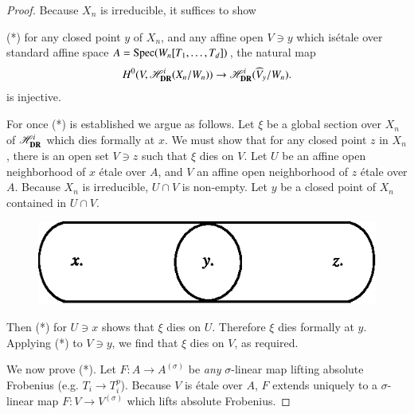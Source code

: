 \begin{proof}
Because $X_{n}$ is irreducible, it suffices to show

\smallskip
\noindent
(*) for any closed point $y$ of $X_{n}$, and any affine open $V\ni y$ which is\break \'etale over standard affine space $A=\operatorname{Spec}(W_{n}[T_{1},\ldots,T_{d}])$, the natural map
$$
H^{0}(V,\mathscr{H}^{i}_{\mathbf{DR}}(X_{n}/W_{n}))\to \mathscr{H}^{i}_{\mathbf{DR}}(\widehat{V}_{y}/W_{n}).
$$
is injective.

For once (*) is established we argue as follows. Let $\xi$ be a global section over $X_{n}$ of $\mathscr{H}^{i}_{\mathbf{DR}}$ which dies formally at $x$. We must show that for any closed point $z$ in $X_{n}$, there is an open set $V\ni z$ such that $\xi$ dies on $V$. Let $U$ be an affine open neighborhood of $x$ \'etale over $A$, and $V$ an affine open neighborhood of $z$ \'etale over $A$. Because $X_{n}$ is irreducible, $U\cap V$ is non-empty. Let $y$ be a closed point of $X_{n}$ contained in $U\cap V$.
\begin{figure}[H]
\centering
\includegraphics{chap6/fig17.eps}
\end{figure}
Then (*) for $U\ni x$ shows that $\xi$ dies on $U$. Therefore $\xi$ dies formally at $y$. Applying (*) to $V\ni y$, we find that $\xi$ dies on $V$, as required.

We now prove (*). Let $F:A\to A^{(\sigma)}$ be {\em any} $\sigma$-linear map lifting absolute Frobenius (e.g. $T_{i}\to T^{p}_{i}$). Because $V$ is \'etale over $A$, $F$ extends uniquely to a $\sigma$-linear map $F:V\to V^{(\sigma)}$ which lifts absolute Frobenius.


\end{proof}
